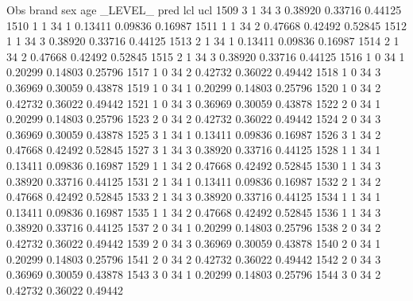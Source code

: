 \documentclass{article}
\begin{document}
\begin{Woutput}
 Obs    brand    sex    age    _LEVEL_      pred       lcl        ucl
1509      3       1      34       3       0.38920    0.33716    0.44125
1510      1       1      34       1       0.13411    0.09836    0.16987
1511      1       1      34       2       0.47668    0.42492    0.52845
1512      1       1      34       3       0.38920    0.33716    0.44125
1513      2       1      34       1       0.13411    0.09836    0.16987
1514      2       1      34       2       0.47668    0.42492    0.52845
1515      2       1      34       3       0.38920    0.33716    0.44125
1516      1       0      34       1       0.20299    0.14803    0.25796
1517      1       0      34       2       0.42732    0.36022    0.49442
1518      1       0      34       3       0.36969    0.30059    0.43878
1519      1       0      34       1       0.20299    0.14803    0.25796
1520      1       0      34       2       0.42732    0.36022    0.49442
1521      1       0      34       3       0.36969    0.30059    0.43878
1522      2       0      34       1       0.20299    0.14803    0.25796
1523      2       0      34       2       0.42732    0.36022    0.49442
1524      2       0      34       3       0.36969    0.30059    0.43878
1525      3       1      34       1       0.13411    0.09836    0.16987
1526      3       1      34       2       0.47668    0.42492    0.52845
1527      3       1      34       3       0.38920    0.33716    0.44125
1528      1       1      34       1       0.13411    0.09836    0.16987
1529      1       1      34       2       0.47668    0.42492    0.52845
1530      1       1      34       3       0.38920    0.33716    0.44125
1531      2       1      34       1       0.13411    0.09836    0.16987
1532      2       1      34       2       0.47668    0.42492    0.52845
1533      2       1      34       3       0.38920    0.33716    0.44125
1534      1       1      34       1       0.13411    0.09836    0.16987
1535      1       1      34       2       0.47668    0.42492    0.52845
1536      1       1      34       3       0.38920    0.33716    0.44125
1537      2       0      34       1       0.20299    0.14803    0.25796
1538      2       0      34       2       0.42732    0.36022    0.49442
1539      2       0      34       3       0.36969    0.30059    0.43878
1540      2       0      34       1       0.20299    0.14803    0.25796
1541      2       0      34       2       0.42732    0.36022    0.49442
1542      2       0      34       3       0.36969    0.30059    0.43878
1543      3       0      34       1       0.20299    0.14803    0.25796
1544      3       0      34       2       0.42732    0.36022    0.49442

\end{Woutput}
\end{document}

